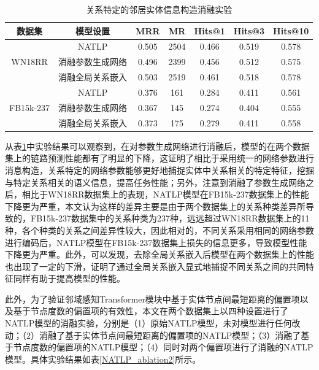 \begin{table}[htbp]
  \begin{center}
      \caption{关系特定的邻居实体信息构造消融实验}
      \setlength{\tabcolsep}{8pt}
      \renewcommand\arraystretch{1.5}
      \begin{tabular}{*{7}{c}}
          \toprule
          数据集 & 模型设置 & MRR&MR&Hits@1&Hits@3&	Hits@10\\
          \midrule
          \multirow{3}{*}{WN18RR}&NATLP&0.505&2504&0.466&0.519&0.578\\
          &消融参数生成网络&0.496&2399&0.456&0.512&0.575\\
          &消融全局关系嵌入&0.503&2519&0.461&0.518&0.578\\
          \cmidrule{1-7}
          \multirow{3}{*}{FB15k-237}&NATLP&0.376&161&0.284&0.411&0.561\\
          &消融参数生成网络&0.367&145&0.274&0.404&0.555\\
          &消融全局关系嵌入&0.373&175&0.279&0.411&0.558\\
          \bottomrule
      \end{tabular}
      \label{NATLP_ablation1}
  \end{center}
\end{table}

从表\ref{NATLP_ablation1}中实验结果可以观察到，在对参数生成网络进行消融后，模型的在两个数据集上的链路预测性能都有了明显的下降，这证明了相比于采用统一的网络参数进行消息构造，关系特定的网络参数能够更好地捕捉实体中关系相关的特定特征，挖掘与特定关系相关的语义信息，提高任务性能；另外，注意到消融了参数生成网络之后，相比于WN18RR数据集上的表现，NATLP模型在FB15k-237数据集上的性能下降更为严重，本文认为这样的差异主要是由于两个数据集上的关系种类差异所导致的，FB15k-237数据集中的关系种类为237种，远远超过WN18RR数据集上的11种，各个种类的关系之间差异性较大，因此相对的，不同关系采用相同的网络参数进行编码后，NATLP模型在FB15k-237数据集上损失的信息更多，导致模型性能下降更为严重。此外，可以发现，去除全局关系嵌入后模型在两个数据集上的性能也出现了一定的下滑，证明了通过全局关系嵌入显式地捕捉不同关系之间的共同特征同样有助于提高模型的性能。

此外，为了验证邻域感知Transformer模块中基于实体节点间最短距离的偏置项以及基于节点度数的偏置项的有效性，本文在两个数据集上以四种设置进行了NATLP模型的消融实验，分别是（1）原始NATLP模型，未对模型进行任何改动；（2）消融了基于实体节点间最短距离的偏置项的NATLP模型；（3）消融了基于节点度数的偏置项的NATLP模型；（4）同时对两个偏置项进行了消融的NATLP模型。具体实验结果如表\ref{NATLP_ablation2}所示。

